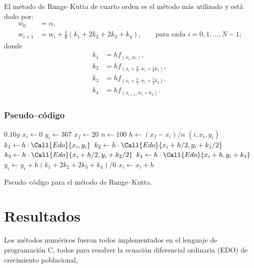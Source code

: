 \documentclass[
    english, spanish, Ce-table, Ce-theorem
]{CabesHW}
\begin{document}
El método de Runge--Kutta de cuarto orden es el método más utilizado y está dado por:
\begin{align*}
    w_0 &= \alpha,\\
    w_{i+1} &= w_i + \frac{1}{6}(k_1 + 2k_2 + 2k_3 + k_4), \qquad \text{para cada $i= 0, 1, \ldots, N-1$;}
\end{align*}
donde
\begin{align*}
    k_1 &= hf_{(x_i, w_i)}, \\
    k_2 &= hf_{(x_i + \frac{h}{2}, w_i + \frac{1}{2}k_1)},\\
    k_3 &= hf_{(x_i + \frac{h}{2}, w_i + \frac{1}{2}k_2)}, \\
    k_4 &= hf_{(x_{i+1}, w_i + k_3)}.
\end{align*}

\subsubsection{Pseudo--código}
\begin{algorithm}[H]
    \centering
    \begin{myalg}[1]
        \State \Output $0.16 y$
    \EndFunction
    \State \phantom{}
    \State $x_i \gets 0$ 
    \State $y_i \gets 367$ 
    \State $x_f \gets 20$ 
    \State $n \gets 100$ 
    \State \phantom{}
    \State $h \gets (x_f - x_i)/n$ 
        \State \Output $(i, x_i, y_i)$
        \State \phantom{}
        \State $k_1 \gets h\cdot\Call{Edo}{x_i, y_i}$
        \State $k_2 \gets h\cdot\Call{Edo}{x_i+h/2, y_i+k_1/2}$
        \State $k_3 \gets h\cdot\Call{Edo}{x_i+h/2, y_i+k_2/2}$
        \State $k_4 \gets h\cdot\Call{Edo}{x_i+h, y_i+k_3}$
        \State \phantom{}
        \State $y_i \gets y_i + h(k_1 + 2k_2 + 2k_3 + k_4)/6$
        \State $x_i \gets x_i + h$
    \EndFor
    \end{myalg}
    \caption{Pseudo--código para el método de Runge--Kutta.}
    \label{alg:runge-kutta}
\end{algorithm}

\section{Resultados}
Los métodos numéricos fueron todos implementados en el lenguaje de programación C, todos para resolver la ecuación diferencial ordinaria (EDO) de crecimiento poblacional,
\end{document}
